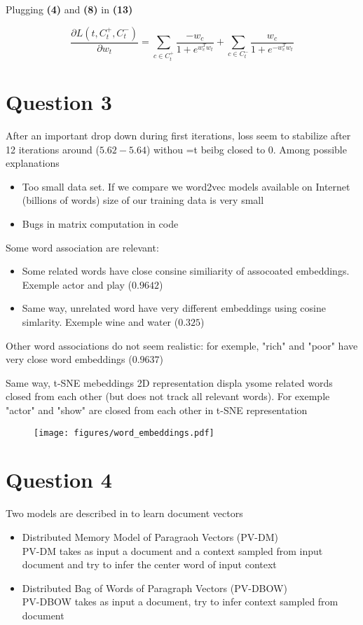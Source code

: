 \documentclass[a4paper]{article}
\begin{document}
Plugging \textbf{(4)} and \textbf{(8)} in \textbf{(13)}

\begin{equation}
\boxed{
\frac{\partial L(t, C_{t}^{+},C_{t}^{-})}{\partial w_{t}} =
\sum_{c \in C_{t}^{+}}
 \frac{-w_{c}}{1 + e^{w_{c}^{T}w_{t}}}
+
\sum_{c \in C_{t}^{-}}
 \frac{w_{c}}{1 + e^{-w_{c}^{T}w_{t}}}
 }
\end{equation}


\section{Question 3}

After an important drop down during first iterations, loss seem to stabilize after 12 iterations around ($5.62-5.64$) withou =t beibg closed to 0.
Among possible explanations
\begin{itemize}
\item Too small data set. If we compare we word2vec models available on Internet (billions of words) size of our training data is very small
\item Bugs in matrix computation in code 
\end{itemize}

Some word association are relevant:
\begin{itemize}
\item Some related words have close consine similiarity of assocoated embeddings. Exemple actor and play ($0.9642$)
\item  Same way, unrelated word have very different embeddings using cosine simlarity. Exemple wine and water ($0.325$)
\end{itemize}

Other word associations do not seem realistic: for exemple, "rich" and "poor" have very close word embeddings ($0.9637$)

Same way, t-SNE mebeddings 2D representation displa ysome  related words closed from each other (but does not track all relevant words). For exemple "actor" and "show" are closed from each other in t-SNE representation


\begin{figure}[ht]
    \centering
	\texttt{[image: figures/word\_embeddings.pdf]}
\end{figure}

\section{Question 4}
Two models are described in \cite{quocLe2014doc2vec} to learn document vectors
\begin{itemize}
\item Distributed Memory Model of Paragraoh Vectors (PV-DM)\\
PV-DM takes as input a document and a context sampled from input document and try to infer the center word of input context
\item Distributed Bag of Words  of Paragraph Vectors (PV-DBOW)\\
PV-DBOW takes as input a document, try to infer context sampled from document
\end{itemize}
\end{document}
